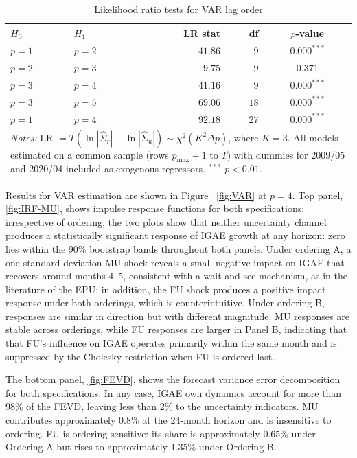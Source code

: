 \documentclass[12pt]{article}
\begin{document}
\begin{table}[H]
\centering
\caption{Likelihood ratio tests for VAR lag order}\label{tab:lr-tests}
\begin{tabular}{llrrc}
\hline
$H_0$ & $H_1$ & LR stat & df & $p$-value \\
\hline
$p = 1$ & $p = 2$ & $41.86$ & $9$  & $0.000^{***}$ \\
$p = 2$ & $p = 3$ &  $9.75$ & $9$  & $0.371$       \\
$p = 3$ & $p = 4$ & $41.16$ & $9$  & $0.000^{***}$ \\
$p = 3$ & $p = 5$ & $69.06$ & $18$ & $0.000^{***}$ \\
$p = 1$ & $p = 4$ & $92.18$ & $27$ & $0.000^{***}$ \\
\hline
\multicolumn{5}{l}{%
  \parbox{0.72\textwidth}{\footnotesize \textit{Notes:}
  LR $= T(\ln|\hat{\Sigma}_r| - \ln|\hat{\Sigma}_u|) \sim \chi^2(K^2 \Delta p)$,
  where $K = 3$. All models estimated on a common sample (rows $p_{\max}+1$ to $T$)
  with dummies for 2009/05 and 2020/04 included as exogenous regressors.
  $^{***}$ $p < 0.01$.}} \\
\end{tabular}
\end{table}


Results for VAR estimation are shown in Figure ~\ref{fig:VAR} at $p=4$. Top panel, \ref{fig:IRF-MU}, shows impulse response functions for both specifications; irrespective of ordering, the two plots show that neither uncertainty channel produces a statistically significant response of IGAE growth at any horizon: zero lies within the 90\% bootstrap bands throughout both panels. Under ordering A, a
one-standard-deviation MU shock reveals a small negative impact on IGAE that recovers around months 4--5, consistent
with a wait-and-see mechanism, as in the literature of the EPU; in addition, the FU shock produces a
positive impact response under both orderings, which is counterintuitive. Under ordering B, responses are similar in direction but with different magnitude. MU responses are
stable across orderings, while FU responses are larger in Panel B, indicating that that FU's influence on IGAE operates primarily within the same month
and is suppressed by the Cholesky restriction when FU is ordered last.


The bottom panel, \ref{fig:FEVD}, shows the forecast variance error decomposition for both specifications. In any case, IGAE own dynamics account for more than 98\% of the FEVD, leaving less than 2\% to the uncertainty indicators. MU contributes approximately 0.8\% at the 24-month horizon and is insensitive to ordering. FU is ordering-sensitive: its share is approximately 0.65\% under Ordering A but rises
to approximately 1.35\% under Ordering B.
\end{document}
